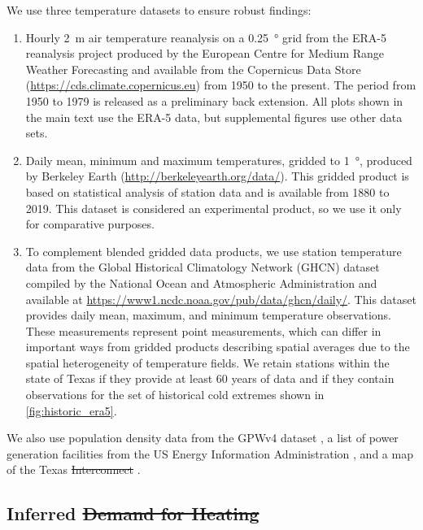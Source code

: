 \documentclass[12pt]{iopart}
\providecommand{\DIFadd}[1]{{\protect\color{blue}\uwave{#1}}} %
\providecommand{\DIFdel}[1]{{\protect\color{red}\sout{#1}}}                      %
\providecommand{\DIFaddbegin}{} %
\providecommand{\DIFaddend}{} %
\providecommand{\DIFdelbegin}{} %
\providecommand{\DIFdelend}{} %
\newcommand{\DIFscaledelfig}{0.5}
\newlength{\DIFdelgraphicswidth} %
\newlength{\DIFdelgraphicsheight} %
\newcommand{\DIFaddincludegraphics}[2][]{{\color{blue}\fbox{\DIFOincludegraphics[#1]{#2}}}} %
\newcommand{\DIFdelincludegraphics}[2][]{%
\sbox{\DIFdelgraphicsbox}{\DIFOincludegraphics[#1]{#2}}%
\settoboxwidth{\DIFdelgraphicswidth}{\DIFdelgraphicsbox} %
\settoboxtotalheight{\DIFdelgraphicsheight}{\DIFdelgraphicsbox} %
\scalebox{\DIFscaledelfig}{%
\parbox[b]{\DIFdelgraphicswidth}{\usebox{\DIFdelgraphicsbox}\\[-\baselineskip] \rule{\DIFdelgraphicswidth}{0em}}\llap{\resizebox{\DIFdelgraphicswidth}{\DIFdelgraphicsheight}{%
\setlength{\unitlength}{\DIFdelgraphicswidth}%
\begin{picture}(1,1)%
\thicklines\linethickness{2pt} %
{\color[rgb]{1,0,0}\put(0,0){\framebox(1,1){}}}%
{\color[rgb]{1,0,0}\put(0,0){\line( 1,1){1}}}%
{\color[rgb]{1,0,0}\put(0,1){\line(1,-1){1}}}%
\end{picture}%
}\hspace*{3pt}}} %
} %
\DeclareRobustCommand{\DIFaddbegin}{\DIFOaddbegin \let\includegraphics\DIFaddincludegraphics} %
\DeclareRobustCommand{\DIFaddend}{\DIFOaddend \let\includegraphics\DIFOincludegraphics} %
\DeclareRobustCommand{\DIFdelbegin}{\DIFOdelbegin \let\includegraphics\DIFdelincludegraphics} %
\DeclareRobustCommand{\DIFdelend}{\DIFOaddend \let\includegraphics\DIFOincludegraphics} %
\begin{document}
We use three temperature datasets to ensure robust findings:
\begin{enumerate}
  \item Hourly \SI{2}{\meter} air temperature reanalysis on a \SI{0.25}{\degree} grid from the ERA-5 reanalysis project produced by the European Centre for Medium Range Weather Forecasting \cite{hersbach_era5:2020} and available  from the Copernicus Data Store (\url{https://cds.climate.copernicus.eu}) from 1950 to the present.
        The period from 1950 to 1979 is released as a preliminary back extension.
        All plots shown in the main text use the ERA-5 data, but supplemental figures use other data sets.
  \item Daily mean, minimum and maximum temperatures, gridded to \SI{1}{\degree}, produced by Berkeley Earth (\url{http://berkeleyearth.org/data/}).
        This gridded product is based on statistical analysis of station data and is available from 1880 to 2019.
        This dataset is considered an experimental product, so we use it only for comparative purposes.
  \item To complement blended gridded data products, we use station temperature data from the Global Historical Climatology Network (GHCN) dataset compiled by the National Ocean and Atmospheric Administration \cite{Menne:2012hk} and available at \url{https://www1.ncdc.noaa.gov/pub/data/ghcn/daily/}.
        This dataset provides daily mean, maximum, and minimum temperature observations.
        These measurements represent point measurements, which can differ in important ways from gridded products describing spatial averages due to the spatial heterogeneity of temperature fields.
        We retain stations within the state of Texas if they provide at least 60 years of data and if they contain observations for the set of historical cold extremes shown in \cref{fig:historic_era5}.
\end{enumerate}
We also use population density data from the GPWv4 dataset \cite{ciesin_gpwv4:2016}, a list of power generation facilities from the US Energy Information Administration \cite{useia_generators:2021}, and a map of the Texas \DIFdelbegin \DIFdel{Interconnect }\DIFdelend \DIFaddbegin \DIFadd{Interconnection }\DIFaddend \cite{useia_regions:2021}.


\subsection{Inferred \DIFdelbegin \DIFdel{Demand for Heating}\DIFdelend \DIFaddbegin \DIFadd{heating demand per capita}\DIFaddend }\label{sec:inferred-demand}
\end{document}
